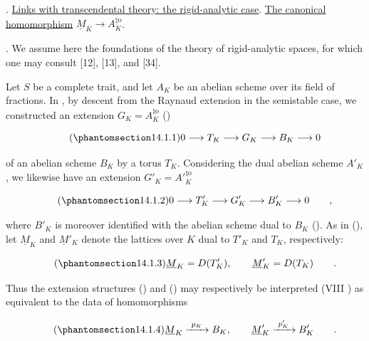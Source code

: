 \medskip
{}. \underline{Links with transcendental theory: the rigid-analytic
case}.  \underline{The canonical homomorphism}
$\underline M_K\longrightarrow A_K^{\natural\mathrm o}$.

\medskip
\noindent
{}. We assume here the foundations of the theory of rigid-analytic
spaces, for which one may consult [12], [13], and [34].

Let $S$ be a complete trait, and let $A_K$ be an abelian scheme over its
field of fractions.  In , by descent from the Raynaud extension in
the semistable case, we constructed an extension
$G_K=A_K^{\natural\mathrm o}$ ()

\begin{equation}\tag{\SGARefTarget{sga7.sga7i.eix.n14-1-1}{14.1.1}}
 0\longrightarrow T_K\longrightarrow G_K\longrightarrow B_K
 \longrightarrow0
\end{equation}

\noindent
of an abelian scheme $B_K$ by a torus $T_K$.  Considering the dual
abelian scheme $A'_K$, we likewise have an extension
$G'_K=A'{}^{\natural\mathrm o}_K$

\begin{equation}\tag{\SGARefTarget{sga7.sga7i.eix.n14-1-2}{14.1.2}}
 0\longrightarrow T'_K\longrightarrow G'_K\longrightarrow B'_K
 \longrightarrow0\qquad ,
\end{equation}

\noindent
where $B'_K$ is moreover identified with the abelian scheme dual to
$B_K$ ().  As in (), let $\underline M_K$ and
$\underline M'_K$ denote the lattices over $K$ dual to $T'_K$ and
$T_K$, respectively:

\begin{equation}\tag{\SGARefTarget{sga7.sga7i.eix.n14-1-3}{14.1.3}}
 \underline M_K=D(T'_K),\qquad \underline M'_K=D(T_K)\qquad .
\end{equation}

\noindent
Thus the extension structures () and () may respectively be
interpreted (VIII ) as equivalent to the data of homomorphisms

\begin{equation}\tag{\SGARefTarget{sga7.sga7i.eix.n14-1-4}{14.1.4}}
 \underline M_K\xrightarrow{\ p_K\ }B_K,\qquad
 \underline M'_K\xrightarrow{\ p'_K\ }B'_K\qquad .
\end{equation}

